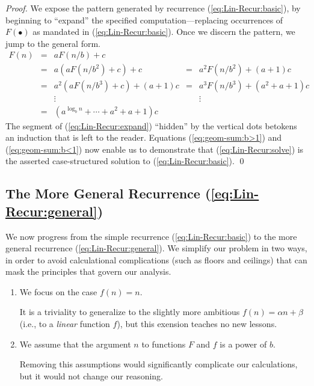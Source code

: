 \begin{proof}
We expose the pattern generated by recurrence
(\ref{eq:Lin-Recur:basic}), by beginning to ``expand'' the specified
computation---replacing occurrences of $F(\bullet)$ as mandated in
(\ref{eq:Lin-Recur:basic}).  Once we discern the pattern, we jump to
the general form.
\begin{equation}
\label{eq:Lin-Recur:expand}
\begin{array}{lcccc}
F(n) & = & a F(n/b) + c & & \\
     & = & a \left( a F(n/b^2) + c \right) + c
             & = & a^2 F(n/b^2) + (a+1)c \\
     & = & a^2 \left( a F(n/b^3) + c \right) + (a+1)c
             & = & a^3 F(n/b^3) + (a^2+a+1)c \\
     &   & \vdots & & \vdots \\
     & = & 
{\displaystyle
\left(a^{\log_b n} + \cdots +a^2+a+1 \right) c
} & &
\end{array}
\end{equation}
The segment of (\ref{eq:Lin-Recur:expand}) ``hidden'' by the vertical
dots betokens an induction that is left to the reader.  Equations
(\ref{eq:geom-sum:b>1}) and (\ref{eq:geom-sum:b<1}) now enable us to
demonstrate that (\ref{eq:Lin-Recur:solve}) is the asserted
case-structured solution to (\ref{eq:Lin-Recur:basic}).  \qed
\end{proof}


\subsection{The More General Recurrence (\ref{eq:Lin-Recur:general})} 
\label{sec:linear-recurrence-general}

We now progress from the simple recurrence (\ref{eq:Lin-Recur:basic}) to
the more general recurrence (\ref{eq:Lin-Recur:general}).  We simplify
our problem in two ways, in order to avoid calculational complications
(such as floors and ceilings) that can mask the principles that govern
our analysis.
\begin{enumerate}
\item
We focus on the case $f(n) = n$.

It is a triviality to generalize to the slightly more ambitious $f(n)
= \alpha n + \beta$ (i.e., to a {\em linear} function $f$), but this
exension teaches no new lessons.
\item
We assume that the argument $n$ to functions $F$ and $f$ is a power of
$b$.

Removing this assumptions would significantly complicate our
calculations, but it would not change our reasoning.
\end{enumerate}

